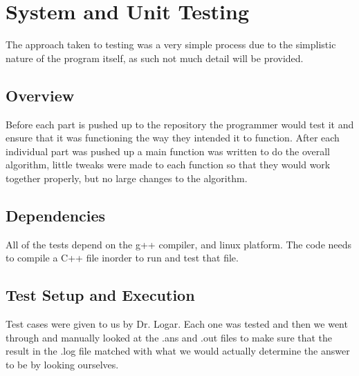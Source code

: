
\chapter{System  and Unit Testing}

The approach taken to testing was a very simple process due to the simplistic nature
of the program itself, as such not much detail will be provided.

\section{Overview}
Before each part is pushed up to the repository the programmer would test it and
ensure that it was functioning the way they intended it to function.  After each
individual part was pushed up a main function was written to do the overall
algorithm, little tweaks were made to each function so that they would work
together properly, but no large changes to the algorithm.



\section{Dependencies}
All of the tests depend on the g++ compiler, and linux platform.  The code needs
to compile a C++ file inorder to run and test that file.


\section{Test Setup and Execution}
Test cases were given to us by Dr. Logar.  Each one was tested and then we went through 
and manually looked at the .ans and .out files to make sure that the result in the .log file
matched with what we would actually determine the answer to be by looking ourselves.

